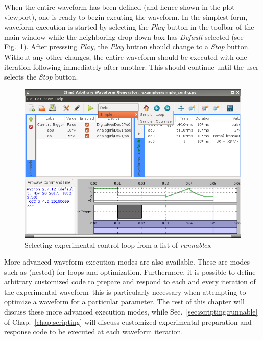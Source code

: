 \thispagestyle{fancy}
\pagestyle{fancy}

When the entire waveform has been defined (and hence shown in the plot
viewport), one is ready to begin excuting the waveform.  In the simplest form,
waveform execution is started by selecting the \textit{Play} button in the
toolbar of the main window while the neighboring drop-down box has
\textit{Default} selected (see Fig.~\ref{fig:iterating:select-iter}).  After
presssing \textit{Play}, the \textit{Play} button should change to a
\textit{Stop} button.  Without any other changes, the entire waveform should be
executed with one iteration following immediately after another.  This should
continue until the user selects the \textit{Stop} button.

\begin{figure}[ht!]
  \centerline{\includegraphics[width=.8\textwidth]{figures/select-iter}}
  \caption[Selecting experimental control loop]{
    Selecting experimental control loop from a list of \textit{runnables}.
  }
  \label{fig:iterating:select-iter}
\end{figure}


More advanced waveform execution modes are also available.  These are modes such
as (nested) for-loops and optimization.  Furthermore, it is possible to define
arbitrary customized code to prepare and respond to each and every iteration of
the experimental waveform--this is particularly necessary when attempting to
optimize a waveform for a particular parameter.  The rest of this chapter will
discuss these more advanced execution modes, while
Sec.~\ref{sec:scripting:runnable} of Chap.~\ref{chap:scripting} will discuss
customized experimental preparation and response code to be executed at each
waveform iteration.

